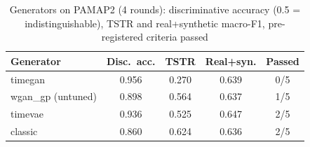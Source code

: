 \begin{table}[t]\centering\caption{Generators on PAMAP2 (4 rounds): discriminative accuracy (0.5 = indistinguishable), TSTR and real+synthetic macro-F1, pre-registered criteria passed}\label{tab:gen}
\footnotesize\begin{tabular}{lcccc}\toprule
Generator & Disc.\ acc. & TSTR & Real+syn. & Passed \\\midrule
timegan & 0.956 & 0.270 & 0.639 & 0/5 \\
wgan\_gp (untuned) & 0.898 & 0.564 & 0.637 & 1/5 \\
timevae & 0.936 & 0.525 & 0.647 & 2/5 \\
classic & 0.860 & 0.624 & 0.636 & 2/5 \\
\bottomrule\end{tabular}\end{table}

